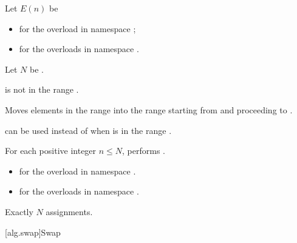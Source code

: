 \begin{itemdescr}
\pnum
Let $E(n)$ be
\begin{itemize}
\item
  for the overload in namespace ;
\item
  for the overloads in namespace .
\end{itemize}
Let $N$ be .

\pnum
\expects
{} is not in the range .

\pnum
\effects
Moves elements in the range 
into the range 
starting from  and proceeding to .
\begin{footnote}
 can be used instead of 
when  is in the range .
\end{footnote}
For each positive integer $n \le N$,
performs .

\pnum
\returns
\begin{itemize}
\item
  for the overload in namespace .
\item
  for the overloads in namespace .
\end{itemize}

\pnum
\complexity
Exactly $N$ assignments.
\end{itemdescr}

[alg.swap]{Swap}

